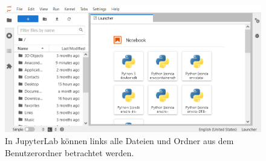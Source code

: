 \documentclass{tufte-handout}
\begin{document}
\begin{figure}[h]
  \includegraphics{jupyterlab-running}
  \caption{In JupyterLab können links alle Dateien und Ordner aus dem Benutzerordner betrachtet werden.}%
\label{fig:start-jupyterlab}
\end{figure}

\doclicenseThis{}
\end{document}
